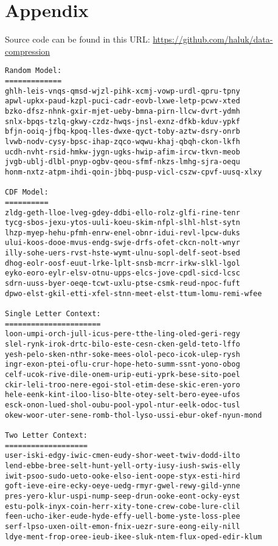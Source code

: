 \documentclass[12pt,letterpaper]{article}
\begin{document}
\section{Appendix}
Source code can be found in this URL: \url{https://github.com/haluk/data-compression}
\begin{verbatim}
Random Model:
=============
ghlh-leis-vnqs-qmsd-wjzl-pihk-xcmj-vowp-urdl-qpru-tpny
apwl-upkx-paud-kzpl-puci-cadr-eovb-lxwe-letp-pcwv-xted
bzko-dfsz-nhnk-gxir-mjet-ueby-bmna-pirn-llcw-dvrt-ydmh
snlx-bpqs-tzlq-gkwy-czdz-hwqs-jnsl-exnz-dfkb-kduv-ypkf
bfjn-ooiq-jfbq-kpoq-lles-dwxe-qyct-toby-aztw-dsry-onrb
lvwb-nodv-cysy-bpsc-ihap-zqco-wqwu-khaj-qbqh-ckon-lkfh
ucdh-nvht-rsid-hmkw-jygn-ugks-hwip-afim-ircw-tkvn-meob
jvgb-ublj-dlbl-pnyp-ogbv-qeou-sfmf-nkzs-lmhg-sjra-oequ
honm-nxtz-atpm-ihdi-qoin-jbbq-pusp-vicl-cszw-cpvf-uusq-xlxy

CDF Model:
==========
zldg-geth-lloe-lveg-gdey-ddbi-ello-rolz-glfi-rine-tenr
tycg-sbos-jexu-ytos-uuli-koeu-skim-nfpl-slhl-hlst-sytn
lhzp-myep-hehu-pfmh-enrw-enel-obnr-idui-revl-lpcw-duks
ului-koos-dooe-mvus-endg-swje-drfs-ofet-ckcn-nolt-wnyr
illy-sohe-uers-rvst-hste-wymt-ulnu-sopl-delf-seot-bsed
dhog-eolr-oosf-euut-lrke-lplt-snsb-mcrr-irkw-slkl-lgol
eyko-eoro-eylr-elsv-otnu-upps-elcs-jove-cpdl-sicd-lcsc
sdrn-uuss-byer-oeqe-tcwt-uxlu-ptse-csmk-reud-npoc-fuft
dpwo-elst-gkil-etti-xfel-stnn-meet-elst-ttum-lomu-remi-wfee

Single Letter Context:
======================
loon-umpi-orch-jull-icus-pere-tthe-ling-oled-geri-regy
slel-rynk-irok-drtc-bilo-este-cesn-cken-geld-teto-lffo
yesh-pelo-sken-nthr-soke-mees-olol-peco-icok-ulep-rysh
ingr-exon-ptei-oflu-crur-hope-heto-summ-ssnt-yono-obog
celf-ucok-rive-dile-onem-urip-euti-yprk-bese-sito-poel
ckir-leli-troo-nere-egoi-stol-etim-dese-skic-eren-yoro
hele-eenk-kint-iloo-liso-blte-otey-selt-bero-eyee-ufos
esck-onon-lued-shol-oubu-pool-ypol-ntur-eelk-odoc-tusl
okew-woor-uter-sene-romb-thol-lyso-ussi-ebur-okef-nyun-mond

Two Letter Context:
===================
user-iski-edgy-iwic-cmen-eudy-shor-weet-twiv-dodd-ilto
lend-ebbe-bree-selt-hunt-yell-orty-iusy-iush-swis-elly
iwit-psoo-sudo-ueto-ooke-elso-ient-oope-styx-esti-hird
goft-ieve-eire-ecky-oeye-uedg-rmyr-gwel-rewy-gild-ynne
pres-yero-klur-uspi-nump-seep-drun-ooke-eont-ocky-eyst
estu-polk-inyx-coin-herr-xity-tone-crew-cobe-lure-clil
feen-ucho-iker-eude-hyde-effy-uell-bome-yste-loss-plee
serf-lpso-uxen-oilt-emon-fnix-uezr-sure-eong-eily-nill
ldye-ment-frop-oree-ieub-ikee-sluk-ntem-flux-oped-edir-klum
\end{verbatim}
\end{document}
